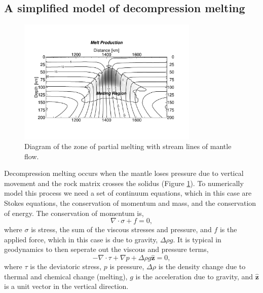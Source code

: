 \begin{subappendices}

\section{A simplified model of decompression melting}

\begin{figure}
\centering
\includegraphics[width=8.6cm]{./figures/ch2-melt-region.pdf}
\caption{Diagram of the zone of partial melting with stream lines of mantle flow.}
\label{fg:melt-region}
\end{figure}

Decompression melting occurs when the mantle loses pressure due to vertical movement and the rock matrix crosses the solidus (Figure \ref{fg:melt-region}). To numerically model this process we need a set of continuum equations, which in this case are Stokes equations, the conservation of momentum and mass, and the conservation of energy. The conservation of momentum is,
\begin{equation}
\nabla \cdot \sigma + f = 0,
\end{equation}
where $\sigma$ is stress, the sum of the viscous stresses and pressure, and $f$ is the applied force, which in this case is due to gravity, $\Delta\rho g$. It is typical in geodynamics to then seperate out the viscous and pressure terms,
\begin{equation}
- \nabla \cdot \tau + \nabla p + \Delta\rho g \hat{\mathbf{z}} = 0,
\label{eq:momentum}
\end{equation}
where $\tau$ is the deviatoric stress, $p$ is pressure, $\Delta\rho$ is the density change due to thermal and chemical change (melting), $g$ is the acceleration due to gravity, and $\hat{\mathbf{z}}$ is a unit vector in the vertical direction.


\end{subappendices}
